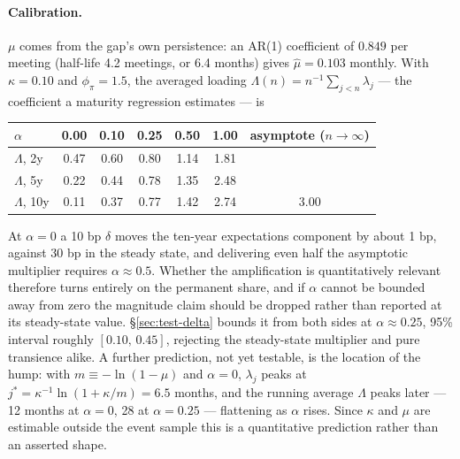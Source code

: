 \documentclass[11pt]{article}
\begin{document}
\paragraph{Calibration.} $\mu$ comes from the gap's own persistence: an AR(1) coefficient of
$0.849$ per meeting (half-life 4.2 meetings, or 6.4 months) gives $\hat\mu=0.103$ monthly. With
$\kappa=0.10$ and $\phi_\pi=1.5$, the averaged loading $\Lambda(n)=n^{-1}\sum_{j<n}\lambda_j$
--- the coefficient a maturity regression estimates --- is
\begin{center}\small
\begin{tabular}{lcccccc}
\toprule
$\alpha$ & 0.00 & 0.10 & 0.25 & 0.50 & 1.00 & asymptote ($n\to\infty$)\\ \midrule
$\Lambda$, 2y & 0.47 & 0.60 & 0.80 & 1.14 & 1.81 & \\
$\Lambda$, 5y & 0.22 & 0.44 & 0.78 & 1.35 & 2.48 & \\
$\Lambda$, 10y & 0.11 & 0.37 & 0.77 & 1.42 & 2.74 & 3.00\\
\bottomrule\end{tabular}
\end{center}
\noindent At $\alpha=0$ a 10 bp $\delta$ moves the ten-year expectations component by about
1 bp, against 30 bp in the steady state, and delivering even half the asymptotic multiplier
requires $\alpha\approx0.5$. Whether the amplification is quantitatively relevant therefore
turns entirely on the permanent share, and if $\alpha$ cannot be bounded away from zero the
magnitude claim should be dropped rather than reported at its steady-state value.
\S\ref{sec:test-delta} bounds it from both sides at $\alpha\approx0.25$, 95\% interval roughly
$[0.10,\,0.45]$, rejecting the steady-state multiplier and pure transience alike. A further prediction,
not yet testable, is the location of the hump: with $m\equiv-\ln(1-\mu)$ and $\alpha=0$,
$\lambda_j$ peaks at $j^{*}=\kappa^{-1}\ln(1+\kappa/m)=6.5$ months, and the running average
$\Lambda$ peaks later --- 12 months at $\alpha=0$, 28 at $\alpha=0.25$ --- flattening as
$\alpha$ rises. Since $\kappa$ and $\mu$ are estimable outside the event sample this is a
quantitative prediction rather than an asserted shape.
\end{document}
